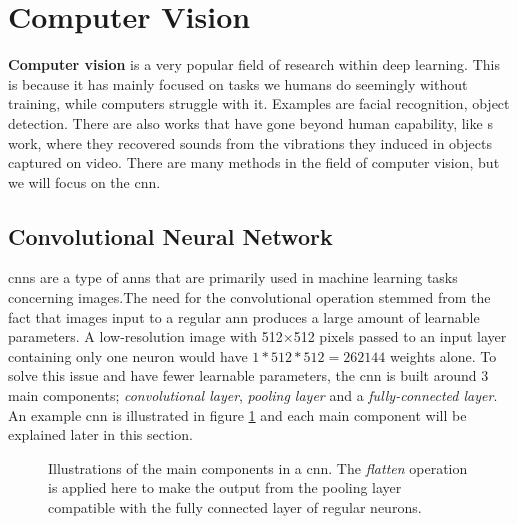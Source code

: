     
\clearpage
\section{Computer Vision} \label{computer vision}
    \textbf{Computer vision} is a very popular field of research within deep learning\cite{voulodimos2018deep_computer_vision}. This is because it has mainly focused on tasks we humans do seemingly without training, while computers struggle with it. Examples are facial recognition, object detection. There are also works that have gone beyond human capability, like \citeauthor{davis2014visual_deep_video_audio}s\cite{davis2014visual_deep_video_audio} work, where they recovered sounds from the vibrations they induced in objects captured on video. There are many methods in the field of computer vision, but we will focus on the \gls{cnn}. 
    
    
    
\subsection{Convolutional Neural Network} \label{cnn}
    \gls{cnn}s are a type of \gls{ann}s that are primarily used in machine learning tasks concerning images\cite{o2015introduction_convolutions}.The need for the convolutional operation stemmed from the fact that images input to a regular \gls{ann} produces a large amount of learnable parameters. A low-resolution image with 512×512 pixels passed to an input layer containing only one neuron would have $1*512*512 = 262144$ weights alone.  To solve this issue and have fewer learnable parameters, the \gls{cnn} is built around 3 main components\cite{o2015introduction_convolutions}; \textit{convolutional layer}, \textit{pooling layer} and a \textit{fully-connected layer}. An example \gls{cnn} is illustrated in figure \ref{convolutional_neural_network_fig} and each main component will be explained later in this section.

    \begin{figure}[H]
        \centering
                        
        \caption[Convolutional neural network example]{Illustrations of the main components in a \gls{cnn}. The \textit{flatten} operation is applied here to make the output from the pooling layer compatible with the fully connected layer of regular neurons.}
      	\medskip 
        \label{convolutional_neural_network_fig}
    \end{figure}
    
